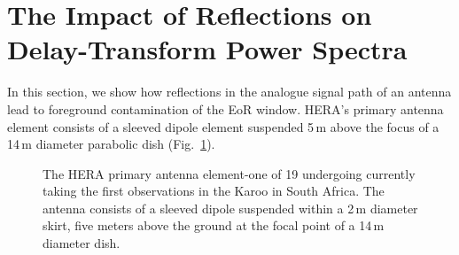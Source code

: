 \documentclass[preprint]{emulateapj}
\begin{document}
\section{The Impact of Reflections on Delay-Transform Power Spectra}\label{sec:Formalism}
In this section, we show how reflections in the analogue signal path of an antenna lead to foreground contamination of the EoR window. HERA's primary antenna element consists of a sleeved dipole element suspended 5\,m above the focus of a 14\,m diameter parabolic dish (Fig.~\ref{fig:Dish}).

\begin{figure}
\caption{The HERA primary antenna element-one of 19 undergoing currently taking the first observations in the Karoo in South Africa. The antenna consists of a sleeved dipole suspended within a 2\,m diameter skirt, five meters above the ground at the focal point of a 14\,m diameter dish.}\label{fig:Dish}
\end{figure}
\end{document}
